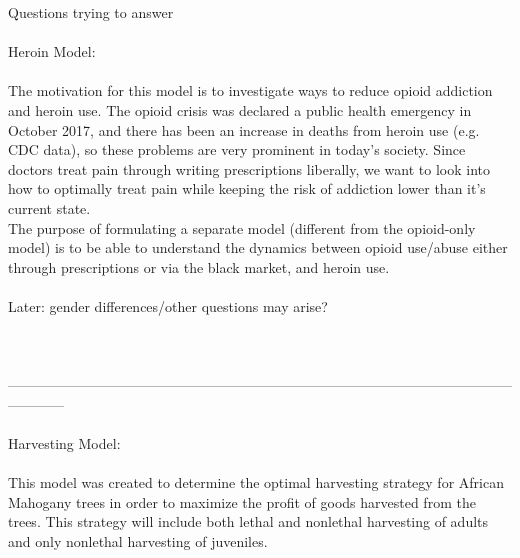 \documentclass[14pt]{exam}
\begin{document}
Questions trying to answer \\ \\

Heroin Model: \\ \\

The motivation for this model is to investigate ways to reduce opioid addiction and heroin use. The opioid crisis was declared a public health emergency in October 2017, and there has been an increase in deaths from heroin use (e.g. CDC data), so these problems are very prominent in today's society. Since doctors treat pain through writing prescriptions liberally, we want to look into how to optimally treat pain while keeping the risk of addiction lower than it's current state. \\ 

The purpose of formulating a separate model (different from the opioid-only model) is to be able to understand the dynamics between opioid use/abuse either through prescriptions or via the black market, and heroin use.  \\ \\

Later: gender differences/other questions may arise? \\ \\ \\ \\
------------------------------------------------------------------------------------------------------------------------ \\ \\
\indent Harvesting Model: \\ \\

This model was created to determine the optimal harvesting strategy for African Mahogany trees in order to maximize the profit of goods harvested from the trees. This strategy will include both lethal and nonlethal harvesting of adults and only nonlethal harvesting of juveniles. 
\end{document}
